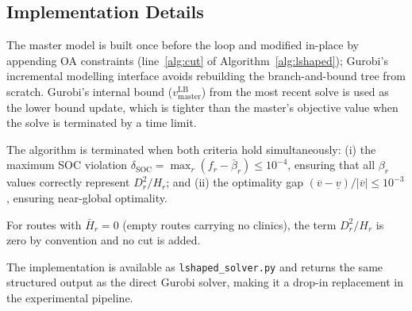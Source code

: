 \subsection{Implementation Details}

The master model is built once before the loop and modified
in-place by appending OA constraints (line~\ref{alg:cut} of
Algorithm~\ref{alg:lshaped}); Gurobi's incremental modelling interface
avoids rebuilding the branch-and-bound tree from scratch.  Gurobi's
internal bound ($v^{\text{LB}}_{\text{master}}$) from the most recent
solve is used as the lower bound update, which is tighter than the
master's objective value when the solve is terminated by a time limit.

The algorithm is terminated when both criteria hold simultaneously:
(i) the maximum SOC violation
$\delta_{\text{SOC}} = \max_r (f_r - \bar\beta_r) \leq 10^{-4}$,
ensuring that all $\beta_r$ values correctly represent $D_r^2/H_r$;
and (ii) the optimality gap
$(\overline{v}-\underline{v})/|\overline{v}| \leq 10^{-3}$,
ensuring near-global optimality.

For routes with $\bar{H}_r = 0$ (empty routes carrying no clinics),
the term $D_r^2/H_r$ is zero by convention and no cut is added.

\medskip
\noindent
The implementation is available as \texttt{lshaped\_solver.py} and
returns the same structured output as the direct Gurobi solver,
making it a drop-in replacement in the experimental pipeline.

